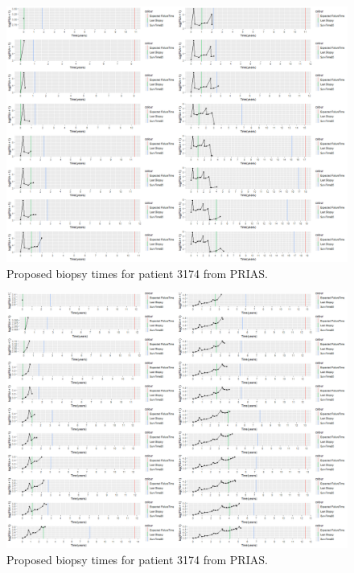 \begin{figure}[!htb]
\centering
\captionsetup{justification=centering}
\includegraphics[width=\textwidth]{prias_demo_pid_911.png}
\caption{\label{fig : prias_demo_pid_911} Proposed biopsy times for patient 3174 from PRIAS.}
\end{figure}

\begin{figure}[!htb]
\centering
\captionsetup{justification=centering}
\includegraphics[width=\textwidth]{prias_demo_pid_2340.png}
\caption{\label{fig : prias_demo_pid_2340} Proposed biopsy times for patient 3174 from PRIAS.}
\end{figure}

